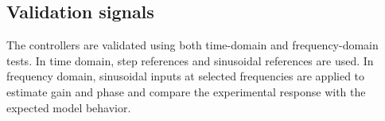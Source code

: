 \subsection{Validation signals}

The controllers are validated using both time-domain and frequency-domain tests. In time domain, step references and sinusoidal references are used. In frequency domain, sinusoidal inputs at selected frequencies are applied to estimate gain and phase and compare the experimental response with the expected model behavior.
